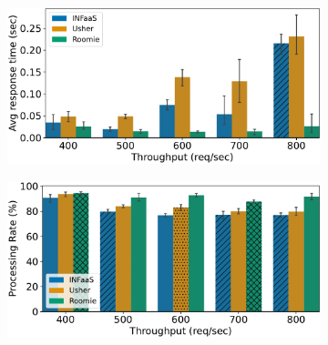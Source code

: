 \begin{figure}[h!]
	\centering
	\begin{subfigure}[b]{0.45\textwidth}
		\centering
		\includegraphics[width=\textwidth]{chapters/roomie/images/JetsonNano/twitter-all-models/response_time.pdf}
	\end{subfigure}
	\hfill
	\begin{subfigure}[b]{0.45\textwidth}
		\centering
		\includegraphics[width=\textwidth]{chapters/roomie/images/JetsonNano/twitter-all-models/normalized.pdf}
	\end{subfigure}
	
	\vspace{0.5cm} %
	

\end{figure}
